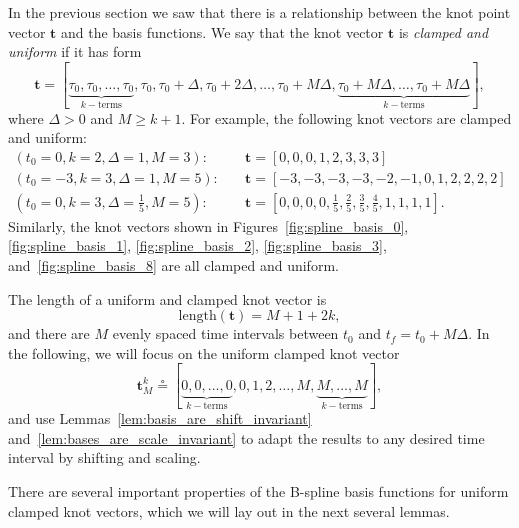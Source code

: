 \documentclass{article}
\newcommand{\defeq}{\circeq}
\begin{document}
In the previous section we saw that there is a relationship between the knot point vector $\mathbf{t}$ and the basis functions.  We say that the knot vector $\mathbf{t}$ is {\em clamped and uniform} if it has form
\[
\mathbf{t} = [\underbrace{\tau_0, \tau_0, \dots, \tau_0}_{k-\text{terms}}, \tau_0, \tau_0+\Delta, \tau_0+2\Delta, \dots, \tau_0+M\Delta, \underbrace{\tau_0+M\Delta, \dots, \tau_0+M\Delta}_{k-\text{terms}}],
\]
where $\Delta>0$ and $M\geq k+1$.  
For example, the following knot vectors are clamped and uniform:
\begin{align*}
	(t_0=0, k=2, \Delta=1, M=3):\quad & \mathbf{t} = [0, 0, 0, 1, 2, 3, 3, 3] \\
	(t_0=-3, k=3, \Delta=1, M=5):\quad & \mathbf{t} = [-3, -3, -3, -3, -2, -1, 0, 1, 2, 2, 2, 2] \\
	(t_0=0, k=3, \Delta=\frac{1}{5}, M=5):\quad & \mathbf{t} = [0, 0, 0, 0, \frac{1}{5}, \frac{2}{5}, \frac{3}{5}, \frac{4}{5}, 1, 1, 1, 1].	
\end{align*}
Similarly, the knot vectors shown in Figures~\ref{fig:spline_basis_0}, \ref{fig:spline_basis_1}, \ref{fig:spline_basis_2}, \ref{fig:spline_basis_3}, and~\ref{fig:spline_basis_8} are all clamped and uniform.  

The length of a uniform and clamped knot vector is 
\[
\text{length}(\mathbf{t}) = M+1 + 2k,
\]
and there are $M$ evenly spaced time intervals between $t_0$ and $t_f=t_0+M\Delta$.  In the following, we will focus on the uniform clamped knot vector
\begin{equation}\label{eq:knot_vector_t_M}
	\mathbf{t}^k_M \defeq [\underbrace{0, 0, \dots, 0}_{k-\text{terms}}, 0, 1, 2, \dots, M, \underbrace{M, \dots, M}_{k-\text{terms}}], 
\end{equation}
and use Lemmas~\ref{lem:basis_are_shift_invariant} and~\ref{lem:bases_are_scale_invariant} to adapt the results to any desired time interval by shifting and scaling.

There are several important properties of the B-spline basis functions for uniform clamped knot vectors, which we will lay out in the next several lemmas.
\end{document}
